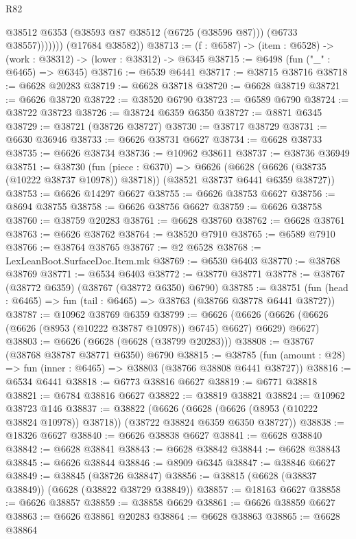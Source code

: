 \begin{lexlean}{R82}
\begin{coremodule}
                  @38512
                  @6353
                  (@38593 @87 @38512 (@6725 (@38596 @87)))
                  (@6733 @38557)))))))
      (@17684 @38582))
@38713 := (f : @6587) -> (item : @6528) -> (work : @38312) -> (lower : @38312) -> @6345
@38715 := @6498 (fun ("_" : @6465) => @6345)
@38716 := @6539 @6441
@38717 := @38715 @38716
@38718 := @6628 @20283
@38719 := @6628 @38718
@38720 := @6628 @38719
@38721 := @6626 @38720
@38722 := @38520 @6790
@38723 := @6589 @6790
@38724 := @38722 @38723
@38726 := @38724 @6359 @6350
@38727 := @8871 @6345
@38729 := @38721 (@38726 @38727)
@38730 := @38717 @38729
@38731 := @6630 @36946
@38733 := @6626 @38731 @6627
@38734 := @6628 @38733
@38735 := @6626 @38734
@38736 := @10962 @38611
@38737 := @38736 @36949
@38751 := @38730
    (fun (piece : @6370) =>
    @6626 (@6628 (@6626 (@38735 (@10222 @38737 @10978)) @38718)) (@38521 @38737 @6441 @6359 @38727))
@38753 := @6626 @14297 @6627
@38755 := @6626 @38753 @6627
@38756 := @8694 @38755
@38758 := @6626 @38756 @6627
@38759 := @6626 @38758
@38760 := @38759 @20283
@38761 := @6628 @38760
@38762 := @6628 @38761
@38763 := @6626 @38762
@38764 := @38520 @7910
@38765 := @6589 @7910
@38766 := @38764 @38765
@38767 := @2 @6528
@38768 := LexLeanBoot.SurfaceDoc.Item.mk
@38769 := @6530 @6403
@38770 := @38768 @38769
@38771 := @6534 @6403
@38772 := @38770 @38771
@38778 := @38767 (@38772 @6359) (@38767 (@38772 @6350) @6790)
@38785 := @38751 (fun (head : @6465) => fun (tail : @6465) => @38763 (@38766 @38778 @6441 @38727))
@38787 := @10962 @38769 @6359
@38799 := @6626
    (@6626 (@6626 (@6626 (@6626 (@8953 (@10222 @38787 @10978)) @6745) @6627) @6629) @6627)
@38803 := @6626 (@6628 (@6628 (@38799 @20283)))
@38808 := @38767 (@38768 @38787 @38771 @6350) @6790
@38815 := @38785 (fun (amount : @28) => fun (inner : @6465) => @38803 (@38766 @38808 @6441 @38727))
@38816 := @6534 @6441
@38818 := @6773 @38816 @6627
@38819 := @6771 @38818
@38821 := @6784 @38816 @6627
@38822 := @38819 @38821
@38824 := @10962 @38723 @146
@38837 := @38822
    (@6626 (@6628 (@6626 (@8953 (@10222 @38824 @10978)) @38718)) (@38722 @38824 @6359 @6350 @38727))
@38838 := @18326 @6627
@38840 := @6626 @38838 @6627
@38841 := @6628 @38840
@38842 := @6628 @38841
@38843 := @6628 @38842
@38844 := @6628 @38843
@38845 := @6626 @38844
@38846 := @8909 @6345
@38847 := @38846 @6627
@38849 := @38845 (@38726 @38847)
@38856 := @38815 (@6628 (@38837 @38849)) (@6628 (@38822 @38729 @38849))
@38857 := @18163 @6627
@38858 := @6626 @38857
@38859 := @38858 @6629
@38861 := @6626 @38859 @6627
@38863 := @6626 @38861 @20283
@38864 := @6628 @38863
@38865 := @6628 @38864

\end{coremodule}
\end{lexlean}
